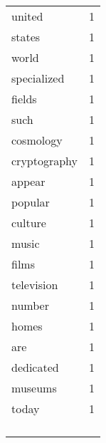 \begin{center}
\begin{scriptsize}
\begin{tabular}{|ll|}
united        & 1\\%
states        & 1\\%
world         & 1\\%
specialized   & 1\\%
fields        & 1\\%
such          & 1\\%
cosmology     & 1\\%
cryptography  & 1\\%
appear        & 1\\%
popular       & 1\\%
culture       & 1\\%
music         & 1\\%
films         & 1\\%
television    & 1\\%
number        & 1\\%
homes         & 1\\%
are           & 1\\%
dedicated     & 1\\%
museums       & 1\\%
today         & 1\\%
&\\
&\\
&\\
&\\
\hline
\end{tabular}
\end{scriptsize}
\end{center}

